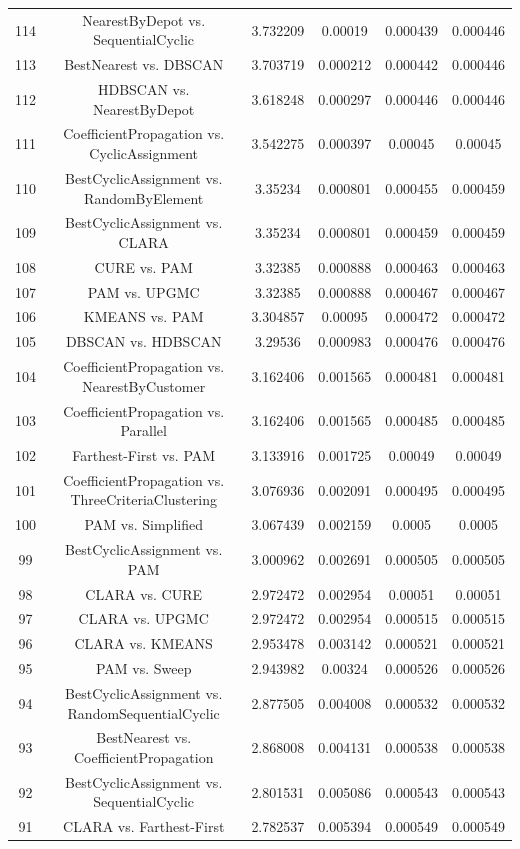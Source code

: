 \documentclass[a4paper,10pt]{article}
\begin{document}
\begin{landscape}
\begin{table}[!htp]
\begin{tabular}{cccccc}
114&NearestByDepot vs. SequentialCyclic&3.732209&0.00019&0.000439&0.000446\\
113&BestNearest vs. DBSCAN&3.703719&0.000212&0.000442&0.000446\\
112&HDBSCAN vs. NearestByDepot&3.618248&0.000297&0.000446&0.000446\\
111&CoefficientPropagation vs. CyclicAssignment&3.542275&0.000397&0.00045&0.00045\\
110&BestCyclicAssignment vs. RandomByElement&3.35234&0.000801&0.000455&0.000459\\
109&BestCyclicAssignment vs. CLARA&3.35234&0.000801&0.000459&0.000459\\
108&CURE vs. PAM&3.32385&0.000888&0.000463&0.000463\\
107&PAM vs. UPGMC&3.32385&0.000888&0.000467&0.000467\\
106&KMEANS vs. PAM&3.304857&0.00095&0.000472&0.000472\\
105&DBSCAN vs. HDBSCAN&3.29536&0.000983&0.000476&0.000476\\
104&CoefficientPropagation vs. NearestByCustomer&3.162406&0.001565&0.000481&0.000481\\
103&CoefficientPropagation vs. Parallel&3.162406&0.001565&0.000485&0.000485\\
102&Farthest-First vs. PAM&3.133916&0.001725&0.00049&0.00049\\
101&CoefficientPropagation vs. ThreeCriteriaClustering&3.076936&0.002091&0.000495&0.000495\\
100&PAM vs. Simplified&3.067439&0.002159&0.0005&0.0005\\
99&BestCyclicAssignment vs. PAM&3.000962&0.002691&0.000505&0.000505\\
98&CLARA vs. CURE&2.972472&0.002954&0.00051&0.00051\\
97&CLARA vs. UPGMC&2.972472&0.002954&0.000515&0.000515\\
96&CLARA vs. KMEANS&2.953478&0.003142&0.000521&0.000521\\
95&PAM vs. Sweep&2.943982&0.00324&0.000526&0.000526\\
94&BestCyclicAssignment vs. RandomSequentialCyclic&2.877505&0.004008&0.000532&0.000532\\
93&BestNearest vs. CoefficientPropagation&2.868008&0.004131&0.000538&0.000538\\
92&BestCyclicAssignment vs. SequentialCyclic&2.801531&0.005086&0.000543&0.000543\\
91&CLARA vs. Farthest-First&2.782537&0.005394&0.000549&0.000549\\

\end{tabular}
\end{table}
\end{landscape}
\end{document}

